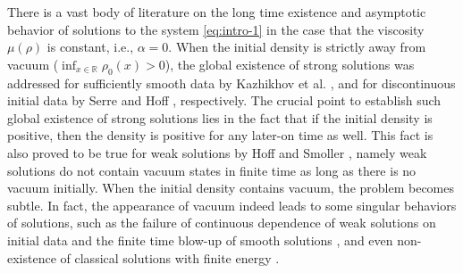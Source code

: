 \documentclass[11pt, reqno]{amsart}
\numberwithin{equation}{section}
\begin{document}
There is a vast body of literature on the long time existence and asymptotic behavior of solutions to the system \eqref{eq:intro-1} in the case that the viscosity $\mu(\rho)$ is constant, i.e., \(\alpha=0\). When the initial density is strictly away from vacuum (\(\inf_{x\in\mathbb{R}} \rho_0(x) > 0\)),
the global existence of strong solutions was addressed for sufficiently smooth data by Kazhikhov et
al. \cite{MR0468593}, and for discontinuous initial data by Serre \cite{MR870700} and Hoff \cite{MR896014}, respectively.
The crucial point to establish such global existence of strong solutions lies in the fact that if the initial density is positive, then the density is positive for any later-on time as well. This fact is also proved to be true
for weak solutions by Hoff and Smoller \cite{MR1814847}, namely weak solutions
do not contain vacuum states in finite time as long as there is no vacuum initially.
When the initial density contains vacuum, the problem becomes subtle.
In fact, the appearance of vacuum indeed leads to some singular behaviors of solutions, such as the failure of continuous dependence of weak solutions on
initial data \cite{MR1117422} and the finite time blow-up of smooth solutions \cite{MR3360663, MR1488513}, and even non-existence of classical solutions with
finite energy \cite{MR3925527}.
\end{document}
